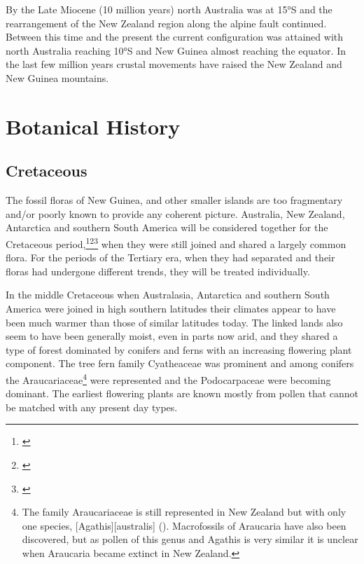 By the Late Miocene (10 million years) north Australia was at \ang{15}S and the rearrangement of the New Zealand region along the alpine fault continued.
Between this time and the present the current configuration was attained with north Australia reaching \ang{10}S and New Guinea almost reaching the equator.
In the last few million years crustal movements have raised the New Zealand and New Guinea mountains.

\section{Botanical History}

\subsection{Cretaceous}

The fossil floras of New Guinea,  and other smaller islands are too fragmentary and/or poorly known to provide any coherent picture.
Australia, New Zealand, Antarctica and southern South America will be considered together for the Cretaceous period,\footnote{\cite{mildenhall1980new}}\footnote{\cite{wace1965vascular}}\footnote{\cite{dettmann1981cretaceous}} when they were still joined and shared a largely common flora.
For the periods of the Tertiary era, when they had separated and their floras had undergone different trends, they will be treated individually.

In the middle Cretaceous when Australasia, Antarctica and southern South America were joined in high southern latitudes their climates appear to have been much warmer than those of similar latitudes today.
The linked lands also seem to have been generally moist, even in parts now arid, and they shared a type of forest dominated by conifers and ferns with an increasing flowering plant component.
The tree fern family Cyatheaceae was prominent and among conifers the Araucariaceae\footnote{The family Araucariaceae is still represented in New Zealand but with only one species, [Agathis][australis] (). Macrofossils of Araucaria have also been discovered, but as pollen of this genus and Agathis is very similar it is unclear when Araucaria became extinct in New Zealand.} were represented and the Podocarpaceae were becoming dominant.
The earliest flowering plants are known mostly from pollen that cannot be matched with any present day types.

